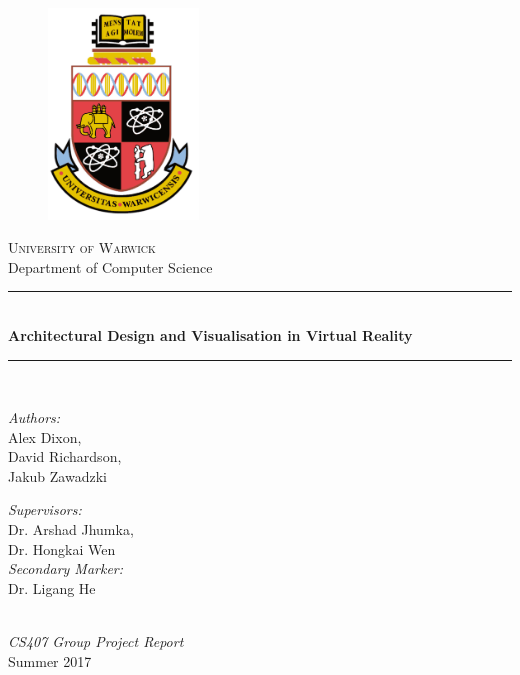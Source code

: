 \documentclass[12pt, a4paper, twoside]{book}
\begin{document}
\frontmatter

\newcommand{\HRule}{\rule{\linewidth}{0.5mm}}

\newcommand{\ttitle}{Architectural Design and Visualisation in Virtual Reality}

\begin{titlepage}
    \begin{center}
        \begin{figure}[ht]
            \centering
            \includegraphics[width=4cm]{crest.jpg}
        \end{figure}
        
        \textsc{\LARGE University of Warwick}\\[0.25cm]
        {\Large{Department of Computer Science}}\\[1.5cm]
        \HRule \\[0.4cm]
        {\huge \bfseries \ttitle}\\
        \HRule \\[1.5cm]
        
        \begin{minipage}{0.4\textwidth}
            \begin{flushleft}
                \large \emph{Authors:}\\Alex Dixon,\\David Richardson,\\Jakub Zawadzki
            \end{flushleft}
        \end{minipage}
        \begin{minipage}{0.4\textwidth}
            \begin{flushright}
                \large \emph{Supervisors:}\\Dr. Arshad Jhumka,\\Dr. Hongkai Wen\\
                \large \emph{Secondary Marker:}\\Dr. Ligang He
            \end{flushright}
        \end{minipage}\\[1cm]
        
        \textit{\large CS407 Group Project Report}\\
        {\large Summer 2017}\\
        
        \vfill
    \end{center}
\end{titlepage}
\end{document}
